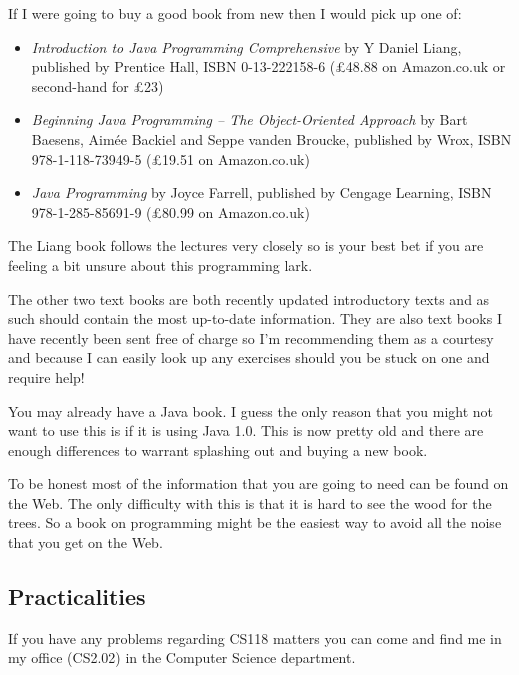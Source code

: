If I were going to buy a good book from new then I would pick up one
of:
\begin{itemize}

\item
{\em Introduction to Java Programming Comprehensive} 
by Y Daniel Liang, published by Prentice Hall, ISBN 0-13-222158-6 
(\pounds 48.88 on Amazon.co.uk or second-hand for \pounds 23)

\item 
{\em Beginning Java Programming -- The Object-Oriented Approach} by 
Bart Baesens, Aim\'{e}e Backiel and Seppe vanden Broucke, published by 
Wrox, ISBN 978-1-118-73949-5 (\pounds 19.51 on Amazon.co.uk)

\item
{\em Java Programming} by Joyce Farrell, published by Cengage Learning, 
ISBN 978-1-285-85691-9 (\pounds 80.99 on Amazon.co.uk)

\end{itemize}

The Liang book follows the lectures very closely so is your best bet if 
you are feeling a bit unsure about this programming lark. 
 
The other two text books are both recently updated introductory texts and as such
should contain the most up-to-date information. They are also text books
I have recently been sent free of charge so I'm recommending them as a
courtesy and because I can easily look up any exercises should you be stuck
on one and require help! 
 
You may already have a Java book. I guess the only reason that you might not 
want to use this is if it is using Java 1.0. This is now pretty old and there
are enough differences to warrant splashing out and buying a new book.
 
To be honest most of the information that you are going to need can be 
found on the Web. The only difficulty with this is that it is hard to see 
the wood for the trees. So a book on programming might
be the easiest way to avoid all the noise that you get on the Web.  

\subsection{Practicalities}

If you have any problems regarding CS118 matters you can come and find me in 
my office (CS2.02) in the Computer Science department.\\
 
